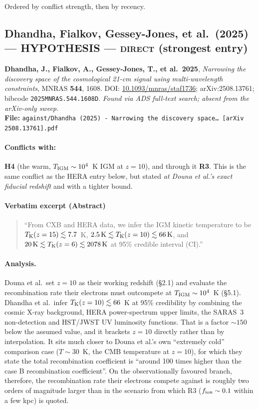 \documentclass[11pt,a4paper]{article}
\newcommand{\HYP}{\textcolor{blue!60!black}{\textbf{HYPOTHESIS}}}
\begin{document}
Ordered by conflict strength, then by recency.

\subsection{Dhandha, Fialkov, Gessey-Jones, et al.\ (2025) --- \HYP{} --- \textsc{direct} (strongest entry)}
\noindent\textbf{Dhandha, J., Fialkov, A., Gessey-Jones, T., et al.\ 2025},
\emph{Narrowing the discovery space of the cosmological 21-cm signal using
multi-wavelength constraints}, MNRAS \textbf{544}, 1608. DOI:
\href{https://doi.org/10.1093/mnras/staf1736}{10.1093/mnras/staf1736};
arXiv:2508.13761; bibcode \texttt{2025MNRAS.544.1608D}.
\emph{Found via ADS full-text search; absent from the arXiv-only sweep.}\\
\textbf{File:} \texttt{against/Dhandha (2025) - Narrowing the discovery space\dots\ [arXiv 2508.13761].pdf}

\paragraph{Conflicts with:} \textbf{H4} (the warm, $T_{\rm IGM}\sim10^{4}$~K IGM
at $z=10$), and through it \textbf{R3}. This is the same conflict as the HERA
entry below, but stated \emph{at Douna et al.'s exact fiducial redshift} and
with a tighter bound.

\paragraph{Verbatim excerpt (Abstract)}
\begin{quote}\small
``From CXB and HERA data, we infer the IGM kinetic temperature to be
$T_{\rm K}(z = 15) \lesssim 7.7$~K, $2.5\,{\rm K} \lesssim T_{\rm K}(z = 10)
\lesssim 66\,{\rm K}$, and $20\,{\rm K} \lesssim T_{\rm K}(z = 6) \lesssim
2078\,{\rm K}$ at 95\% credible interval (CI).''
\end{quote}

\paragraph{Analysis.}
Douna et al.\ set $z=10$ as their working redshift (\S2.1) and evaluate the
recombination rate their electrons must outcompete at $T_{\rm IGM}\sim10^{4}$~K
(\S5.1). Dhandha et al.\ infer $T_{\rm K}(z=10)\lesssim66$~K at 95\% credibility
by combining the cosmic X-ray background, HERA power-spectrum upper limits, the
SARAS~3 non-detection and HST/JWST UV luminosity functions. That is a factor
$\sim150$ below the assumed value, and it brackets $z=10$ directly rather than
by interpolation. It sits much closer to Douna et al.'s own ``extremely cold''
comparison case ($T\sim30$~K, the CMB temperature at $z=10$), for which they
state the total recombination coefficient is ``around 100 times higher than the
case B recombination coefficient''. On the observationally favoured branch,
therefore, the recombination rate their electrons compete against is roughly two
orders of magnitude larger than in the scenario from which R3
($f_{\rm ion}\sim0.1$ within a few kpc) is quoted.
\end{document}
